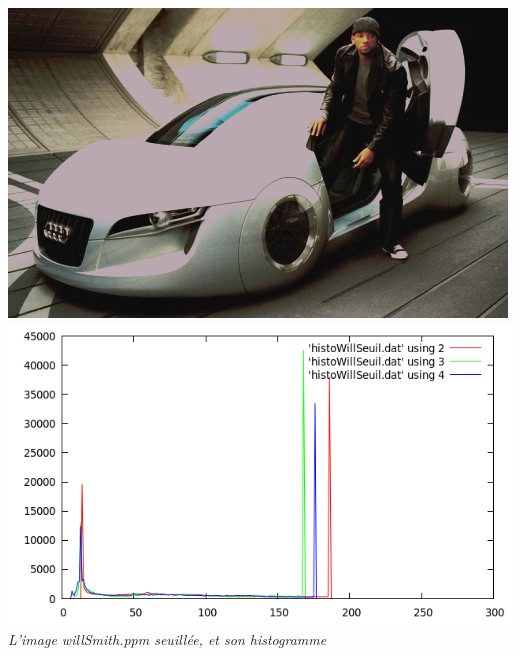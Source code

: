 \documentclass[a4paper,11pt]{article}
\begin{document}
\begin{center}
\includegraphics[scale=0.25]{willseuil.png}
\includegraphics[scale=0.25]{histoWillSeuil.png}\\
\textit{L'image willSmith.ppm seuillée, et son histogramme}
\end{center}
\vspace*{0.5cm}
\end{document}

